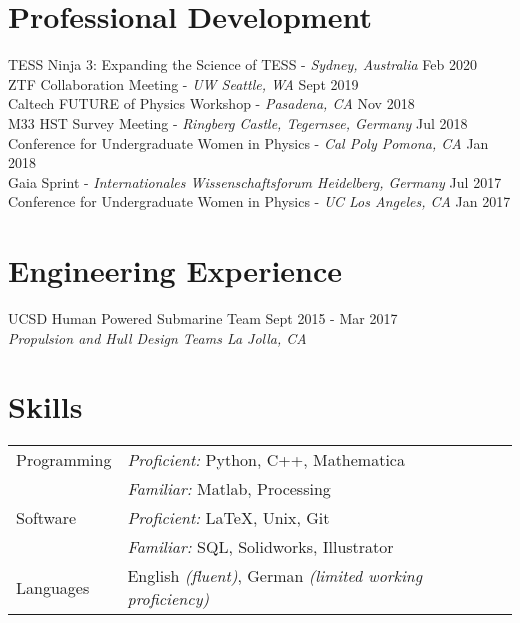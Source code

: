 \documentclass[margin,line]{resume}
\begin{document}
\begin{resume}
\section{\mysidestyle \textcolor{bcolor}{Professional Development}}
TESS Ninja 3: Expanding the Science of TESS - \textit{Sydney, Australia} \hfill Feb 2020 \\
ZTF Collaboration Meeting - \textit{UW Seattle, WA} \hfill Sept 2019 \\
Caltech FUTURE of Physics Workshop - \textit{Pasadena, CA} \hfill Nov 2018 \\
M33 HST Survey Meeting - \textit{Ringberg Castle, Tegernsee, Germany} \hfill Jul 2018 \\
Conference for Undergraduate Women in Physics - \textit{Cal Poly Pomona, CA}  \hfill Jan 2018 \\
Gaia Sprint - \textit{Internationales Wissenschaftsforum Heidelberg, Germany}  \hfill Jul 2017 \\
{Conference for Undergraduate Women in Physics} - \textit{UC Los Angeles, CA}  \hfill Jan 2017 


\section{\mysidestyle \textcolor{bcolor}{Engineering Experience}}
UCSD Human Powered Submarine Team \hfill Sept 2015 - Mar 2017 \\
\-\hspace{.25cm} \textit{Propulsion and Hull Design Teams \hfill La Jolla, CA}  


\section{\mysidestyle \textcolor{bcolor}{Skills}} 

\noindent\begin{tabular}{@{}l|l}
  \multirow{1}{*}{{\sc Programming}} & \textit{Proficient:} Python, C++, Mathematica \\
  	& \textit{Familiar:} Matlab, Processing \vspace{.1cm} \\
  \multirow{1}{*}{{\sc Software}} & \textit{Proficient:} \LaTeX, Unix, Git \\
  	& \textit{Familiar:} SQL, Solidworks, Illustrator  \vspace{.1cm} \\
  \multirow{1}{*}{{\sc Languages}} & English \textit{(fluent)}, German \textit{(limited working proficiency)}
\end{tabular}


\end{resume}
\end{document}
